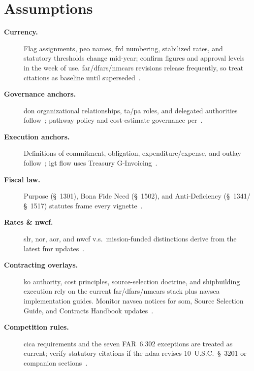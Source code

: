 \documentclass[../main.tex]{subfiles}
\begin{document}

\section{Assumptions}
\begin{description}
  \item[\textbf{Currency.}] Flag assignments, \ac{peo} names, \ac{frd} numbering, stabilized rates, and statutory thresholds change mid-year; confirm figures and approval levels in the week of use. \ac{far}/\ac{dfars}/\ac{nmcars} revisions release frequently, so treat citations as baseline until superseded~\autocite{FAR,DFARS,NMCARS}.
  \item[\textbf{Governance anchors.}] \ac{don} organizational relationships, \ac{ta}/\ac{pa} roles, and delegated authorities follow~\autocite{SECNAV5400-15D,SECNAV5000-2G}; pathway policy and cost-estimate governance per~\autocite{DoDI5000-85}.
  \item[\textbf{Execution anchors.}] Definitions of commitment, obligation, expenditure/expense, and outlay follow~\autocite{DoDFMR-Vol3}; \ac{igt} flow uses Treasury G-Invoicing~\autocite{Treasury-GInvoicing}.
  \item[\textbf{Fiscal law.}] Purpose (\S~1301), Bona Fide Need (\S~1502), and Anti-Deficiency (\S~1341/\S~1517) statutes frame every vignette~\autocite{USC-1301-Purpose,USC-1502-BFN,USC-1341-ADA}.
  \item[\textbf{Rates \& \ac{nwcf}.}] \ac{slr}, \ac{nor}, \ac{aor}, and \ac{nwcf} v.s.\ mission-funded distinctions derive from the latest \ac{fmr} updates~\autocite{DoDFMR-Vol3,DoDFMR-Vol3-Ch19}.
  \item[\textbf{Contracting overlays.}] \ac{ko} authority, cost principles, source-selection doctrine, and shipbuilding execution rely on the current \ac{far}/\ac{dfars}/\ac{nmcars} stack plus \ac{navsea} implementation guides. Monitor \ac{navsea} notices for \ac{som}, Source Selection Guide, and Contracts Handbook updates~\autocite{FAR,DFARS,NMCARS,SOM-Ch3-2023,NAVSEA-Source-Selection-Guide-2022,NAVSEA-Contracts-Handbook-2023}.
  \item[\textbf{Competition rules.}] \ac{cica} requirements and the seven FAR~6.302 exceptions are treated as current; verify statutory citations if the \ac{ndaa} revises 10~U.S.C.~\S~3201 or companion sections~\autocite{USC-3201-CICA,FAR}.

\end{description}
\end{document}
